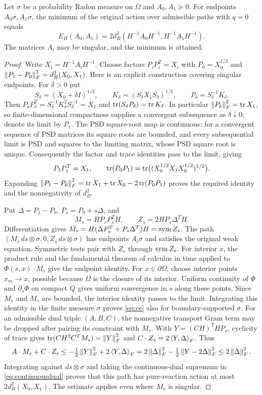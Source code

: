 \begin{lemma}\label{lem:pure}
Let $\sigma$ be a probability Radon measure on $\Omega$ and
$A_0,A_1\succeq0$. For endpoints $A_0\sigma,A_1\sigma$, the minimum
of the original action over admissible paths with $q=0$ equals
\begin{equation}\label{eq:buresvalue}
 E_H(A_0,A_1)=2d_B^2(H^{-1}A_0H^{-1},H^{-1}A_1H^{-1}).
\end{equation}
The matrices $A_i$ may be singular, and the minimum is attained.
\end{lemma}
\begin{proof}
Write $X_i=H^{-1}A_iH^{-1}$. Choose factors $P_iP_i^T=X_i$ with
$P_0=X_0^{1/2}$ and $\left\lVert P_1-P_0\right\rVert_F^2=d_B^2(X_0,X_1)$.
Here is an explicit construction covering singular endpoints. For $\delta>0$ put
\[
 S_\delta=(X_0+\delta I)^{1/2},\qquad
 K_\delta=(S_\delta X_1S_\delta)^{1/2},\qquad
 P_\delta=S_\delta^{-1}K_\delta.
\]
Then $P_\delta P_\delta^T=S_\delta^{-1}K_\delta^2S_\delta^{-1}=X_1$
and $\operatorname{tr}(S_\delta P_\delta)=\operatorname{tr} K_\delta$. In particular
$\left\lVert P_\delta\right\rVert_F^2=\operatorname{tr} X_1$, so finite-dimensional compactness supplies
a convergent subsequence as $\delta\downarrow0$; denote its limit by $P_1$.
The PSD square-root map is continuous: for a convergent sequence of PSD
matrices its square roots are bounded, and every subsequential limit is PSD
and squares to the limiting matrix, whose PSD square root is unique.
Consequently the factor and trace identities pass to the limit, giving
\[
 P_1P_1^T=X_1,\qquad
 \operatorname{tr}(P_0P_1)=\operatorname{tr}\bigl((X_0^{1/2}X_1X_0^{1/2})^{1/2}\bigr).
\]
Expanding
$\left\lVert P_1-P_0\right\rVert_F^2=\operatorname{tr} X_1+\operatorname{tr} X_0-2\operatorname{tr}(P_0P_1)$ proves the required
identity and the nonnegativity of $d_B^2$.

Put $\Delta=P_1-P_0$, $P_s=P_0+s\Delta$, and
\[
 M_s=HP_sP_s^TH,\qquad Z_s=2HP_s\Delta^TH.
\]
Differentiation gives
$\dot M_s=H(\Delta P_s^T+P_s\Delta^T)H=\operatorname{sym} Z_s$. The path
$(M_s\,ds\otimes\sigma,0,Z_s\,ds\otimes\sigma)$ has endpoints
$A_i\sigma$ and satisfies the original weak equation. Symmetric tests pair
with $Z_s$ through $\operatorname{sym} Z_s$. For interior $x$, the product rule and the
fundamental theorem of calculus in time applied to $\Phi(s,x)\cdot M_s$ give the endpoint
identity. For $x\in\partial\Omega$, choose interior points $x_m\to x$,
possible because $\Omega$ is the closure of its interior. Uniform continuity
of $\Phi$ and $\partial_s\Phi$ on compact $Q$ gives uniform convergence
in $s$ along these points. Since $M_s$ and $\dot M_s$ are bounded, the
interior identity passes to the limit. Integrating this identity in the
finite measure $\sigma$ proves \eqref{eq:ce} also for boundary-supported
$\sigma$.
For an admissible dual triple $(A,B,C)$, the nonnegative transport Gram
term may be dropped after pairing its constraint with $M_s$. With
$Y=(CH)^THP_s$, cyclicity of trace gives
$\operatorname{tr}(CH^2C^TM_s)=\left\lVert Y\right\rVert_F^2$ and $C\cdot Z_s=2\left\langle Y,\Delta\right\rangle_F$.
Thus
\[
 A\cdot M_s+C\cdot Z_s
 \le-\tfrac12\left\lVert Y\right\rVert_F^2+2\left\langle Y,\Delta\right\rangle_F
 =2\left\lVert \Delta\right\rVert_F^2-\tfrac12\left\lVert Y-2\Delta\right\rVert_F^2
 \le2\left\lVert \Delta\right\rVert_F^2.
\]
Integrating against $ds\otimes\sigma$ and taking the continuous-dual
supremum in \eqref{eq:continuousdual} proves that this path has
pure-reaction action at most $2d_B^2(X_0,X_1)$. The estimate applies even
where $M_s$ is singular.


\end{proof}
